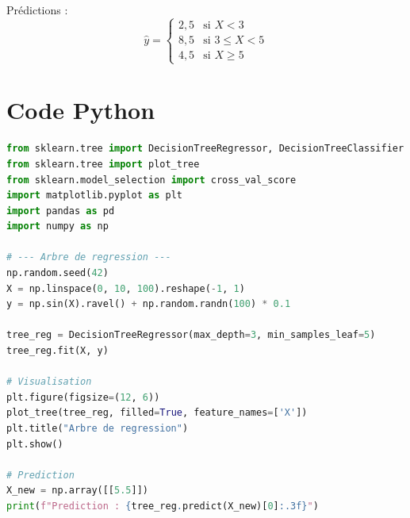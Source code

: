 \documentclass[a4paper,11pt]{article}
\begin{document}
\begin{center}
\end{center}

Prédictions :
\[
\hat{y} = 
\begin{cases}
2{,}5 & \text{si } X < 3 \\
8{,}5 & \text{si } 3 \le X < 5 \\
4{,}5 & \text{si } X \ge 5
\end{cases}
\]

\section{Code Python}

\begin{lstlisting}[language=Python, caption=Arbre de régression/classification avec scikit-learn]
from sklearn.tree import DecisionTreeRegressor, DecisionTreeClassifier
from sklearn.tree import plot_tree
from sklearn.model_selection import cross_val_score
import matplotlib.pyplot as plt
import pandas as pd
import numpy as np

# --- Arbre de regression ---
np.random.seed(42)
X = np.linspace(0, 10, 100).reshape(-1, 1)
y = np.sin(X).ravel() + np.random.randn(100) * 0.1

tree_reg = DecisionTreeRegressor(max_depth=3, min_samples_leaf=5)
tree_reg.fit(X, y)

# Visualisation
plt.figure(figsize=(12, 6))
plot_tree(tree_reg, filled=True, feature_names=['X'])
plt.title("Arbre de regression")
plt.show()

# Prediction
X_new = np.array([[5.5]])
print(f"Prediction : {tree_reg.predict(X_new)[0]:.3f}")
\end{lstlisting}
\end{document}
